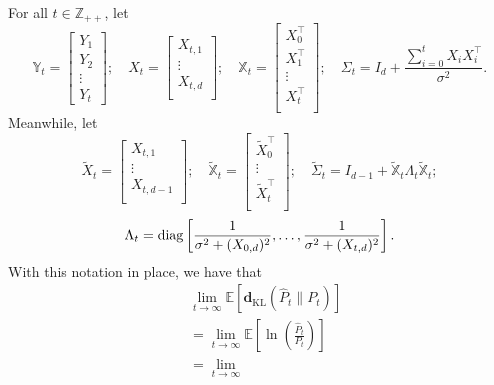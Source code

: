 \documentclass[twoside,11pt]{article}
\renewenvironment{proof}{\par\noindent{\bf Proof\ }}{\hfill\BlackBox\\[2mm]}
\newenvironment{proof}{\par\noindent{\bf Proof\ }}{\hfill\BlackBox\\[2mm]}
\def\KL{\mathbf{d}_{\mathrm{KL}}}
\def\E{\mathbb{E}}
\begin{document}
\missingFeature*
\begin{proof}
    For all $t \in \mathbb{Z}_{++}$, let
    $$\mathbb{Y}_{t} =
        \begin{bmatrix}
            Y_1\\
            Y_2\\
            \vdots\\
            Y_t
        \end{bmatrix};
        \quad
        X_t = \begin{bmatrix}
            X_{t,1}\\
            \vdots\\
            X_{t,d}\\
        \end{bmatrix};
        \quad \mathbb{X}_t = 
        \begin{bmatrix}
            X_0^\top\\
            X_1^\top\\
            \vdots\\
            X_t^\top\\
        \end{bmatrix};
        \quad \Sigma_t = I_d + \frac{\sum_{i=0}^{t} X_iX_i^\top}{\sigma^2}.
    $$
    Meanwhile, let
    $$
        \tilde{X}_t =
        \begin{bmatrix}
            X_{t,1}\\
            \vdots\\
            X_{t,d-1}\\
        \end{bmatrix};\quad
        \tilde{\mathbb{X}}_t =
        \begin{bmatrix}
            \tilde{X}_0^\top\\
            \vdots\\
            \tilde{X}_t^\top\\
        \end{bmatrix};\quad
        \tilde{\Sigma}_t = I_{d-1} + \tilde{\mathbb{X}}_t\Lambda_{t}\tilde{\mathbb{X}}_t;
    $$
    $$
        \Lambda_t = {\rm diag}\left[\frac{1}{\sigma^2 + (X_{0,d})^2},\hdots, \frac{1}{\sigma^2 + (X_{t,d})^2} \right].
    $$
    With this notation in place, we have that
    \begin{align*}
        & \lim_{t\rightarrow\infty}\E\left[\KL(\hat{P}_t\|P_t)\right]\\
        & = \lim_{t\rightarrow\infty}\E\left[\ln\left(\frac{\hat{P}_t}{P_t}\right)\right]\\
        & = \lim_{t\rightarrow\infty}\\

\end{align*}
\end{proof}
\end{document}
